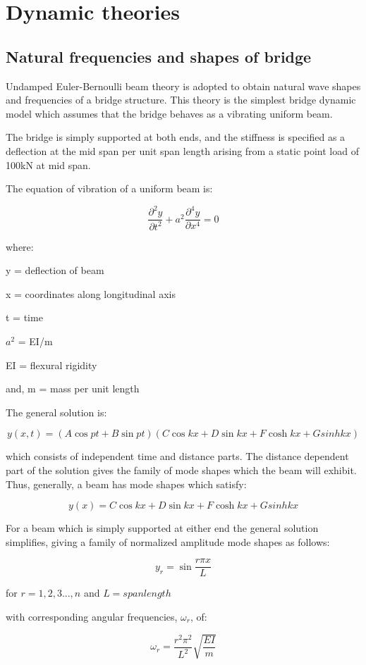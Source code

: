 \section{Dynamic theories}

\subsection{Natural frequencies and shapes of bridge}
Undamped Euler-Bernoulli beam theory is adopted to obtain natural wave shapes and frequencies of a bridge structure. This theory is the simplest bridge dynamic model which assumes that the bridge behaves as a vibrating uniform beam. 

The bridge is simply supported at both ends, and the stiffness is specified as a deflection at the mid span per unit span length arising from a static point load of 100kN at mid span.

The equation of vibration of a uniform beam is:

$$\frac{\partial^2 y}{\partial t^2} + a^2\frac{\partial^4 y}{\partial x^4}=0$$

where: 

y = deflection of beam

x = coordinates along longitudinal axis

t = time 

$a^2$ = EI/m

EI = flexural rigidity

and, m = mass per unit length

The general solution is:

$$y(x,t) = (A\cos pt+B\sin pt)(C\cos kx + D\sin kx + F\cosh kx + Gsinh kx)$$

which consists of independent time and distance parts. The distance dependent part of the solution gives the family of mode shapes which the beam will exhibit. Thus, generally, a beam has mode shapes which satisfy:

$$y(x) = C\cos kx + D\sin kx + F\cosh kx + Gsinh kx $$

For a beam which is simply supported at either end the general solution simplifies, giving a family of normalized amplitude mode shapes as follows:

$$y_r = \sin \frac{r\pi x}{L}$$

for $r = 1,2,3...,n$ and $L = span length$

with corresponding angular frequencies, $\omega_r$, of:

$$\omega_r = \frac{r^2 \pi^2}{L^2}\sqrt{\frac{EI}{m}}$$

